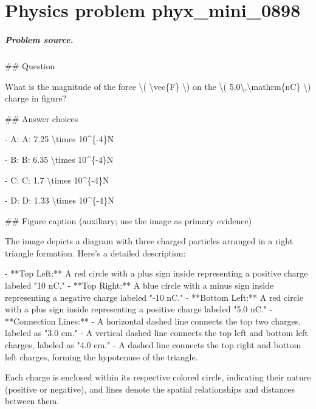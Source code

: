 
\chapter{Physics problem phyx\_mini\_0898}
\label{ch:PhyXMiniProblems_problem_phyx_mini_0898}

\paragraph{Problem source.}
\#\# Question

What is the magnitude of the force \textbackslash{}( \textbackslash{}vec\{F\} \textbackslash{}) on the \textbackslash{}( 5.0\textbackslash{},\textbackslash{}mathrm\{nC\} \textbackslash{}) charge in figure?

\#\# Answer choices

- A: A: 7.25 \textbackslash{}times 10\textasciicircum{}\{-4\}N

- B: B: 6.35 \textbackslash{}times 10\textasciicircum{}\{-4\}N

- C: C: 1.7 \textbackslash{}times 10\textasciicircum{}\{-4\}N

- D: D: 1.33 \textbackslash{}times 10\textasciicircum{}\{-4\}N

\#\# Figure caption (auxiliary; use the image as primary evidence)

The image depicts a diagram with three charged particles arranged in a right triangle formation. Here's a detailed description:

- **Top Left:** A red circle with a plus sign inside representing a positive charge labeled "10 nC."
- **Top Right:** A blue circle with a minus sign inside representing a negative charge labeled "-10 nC."
- **Bottom Left:** A red circle with a plus sign inside representing a positive charge labeled "5.0 nC."
- **Connection Lines:** 
  - A horizontal dashed line connects the top two charges, labeled as "3.0 cm."
  - A vertical dashed line connects the top left and bottom left charges, labeled as "4.0 cm."
  - A dashed line connects the top right and bottom left charges, forming the hypotenuse of the triangle.

Each charge is enclosed within its respective colored circle, indicating their nature (positive or negative), and lines denote the spatial relationships and distances between them.

